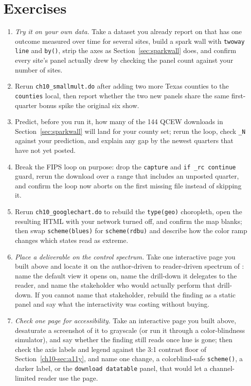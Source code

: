 \section*{Exercises}
\begin{enumerate}
\item \emph{Try it on your own data.} Take a dataset you already report on that has one outcome measured over time for several sites, build a spark wall with \texttt{twoway line} and \texttt{by()}, strip the axes as Section~\ref{sec:sparkwall} does, and confirm every site's panel actually drew by checking the panel count against your number of sites.
\item Rerun \texttt{ch10\_smallmult.do} after adding two more Texas counties to the \texttt{counties} local, then report whether the two new panels share the same first-quarter bonus spike the original six show.
\item Predict, before you run it, how many of the 144 QCEW downloads in Section~\ref{sec:sparkwall} will land for your county set; rerun the loop, check \texttt{\_N} against your prediction, and explain any gap by the newest quarters that have not yet posted.
\item Break the FIPS loop on purpose: drop the \texttt{capture} and \texttt{if \_rc continue} guard, rerun the download over a range that includes an unposted quarter, and confirm the loop now aborts on the first missing file instead of skipping it.
\item Rerun \texttt{ch10\_googlechart.do} to rebuild the \texttt{type(geo)} choropleth, open the resulting HTML with your network turned off, and confirm the map blanks; then swap \texttt{scheme(blues)} for \texttt{scheme(rdbu)} and describe how the color ramp changes which states read as extreme.
\item \emph{Place a deliverable on the control spectrum.} Take one interactive page you built above and locate it on the author-driven to reader-driven spectrum of \textcite{segel2010narrative}: name the default view it opens on, name the drill-down it delegates to the reader, and name the stakeholder who would actually perform that drill-down. If you cannot name that stakeholder, rebuild the finding as a static panel and say what the interactivity was costing without buying.
\item \emph{Check one page for accessibility.} Take an interactive page you built above, desaturate a screenshot of it to grayscale (or run it through a color-blindness simulator), and say whether the finding still reads once hue is gone; then check the axis labels and legend against the 3:1 contrast floor of Section~\ref{ch10-sec:a11y}, and name one change, a colorblind-safe \texttt{scheme()}, a darker label, or the \texttt{download datatable} panel, that would let a channel-limited reader use the page.

\end{enumerate}
